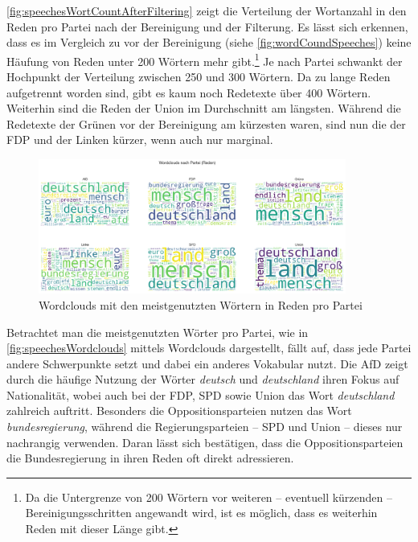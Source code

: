 \autoref{fig:speechesWortCountAfterFiltering} zeigt die Verteilung der Wortanzahl in den Reden pro Partei nach der Bereinigung und der Filterung. Es lässt sich erkennen, dass es im Vergleich zu vor der Bereinigung (siehe \autoref{fig:wordCoundSpeeches}) keine Häufung von Reden unter \num{200} Wörtern mehr gibt.\footnote{Da die Untergrenze von \num{200} Wörtern vor weiteren -- eventuell kürzenden -- Bereinigungsschritten angewandt wird, ist es möglich, dass es weiterhin Reden mit dieser Länge gibt.} Je nach Partei schwankt der Hochpunkt der Verteilung zwischen \num{250} und \num{300} Wörtern. Da zu lange Reden aufgetrennt worden sind, gibt es kaum noch Redetexte über \num{400} Wörtern. Weiterhin sind die Reden der Union im Durchschnitt am längsten. Während die Redetexte der Grünen vor der Bereinigung am kürzesten waren, sind nun die der \ac{FDP} und der Linken kürzer, wenn auch nur marginal.

\begin{figure}[H]
    \centering
    \includegraphics[width=0.9\textwidth]{data/images/speeches_wordclouds.png}
    \caption{Wordclouds mit den meistgenutzten Wörtern in Reden pro Partei} \label{fig:speechesWordclouds}
\end{figure}

Betrachtet man die meistgenutzten Wörter pro Partei, wie in \autoref{fig:speechesWordclouds} mittels Wordclouds dargestellt, fällt auf, dass jede Partei andere Schwerpunkte setzt und dabei ein anderes Vokabular nutzt. Die \ac{AfD} zeigt durch die häufige Nutzung der Wörter \textit{deutsch} und \textit{deutschland} ihren Fokus auf Nationalität, wobei auch bei der \ac{FDP}, \ac{SPD} sowie Union das Wort \textit{deutschland} zahlreich auftritt. Besonders die Oppositionsparteien nutzen das Wort \textit{bundesregierung}, während die Regierungsparteien -- \ac{SPD} und Union -- dieses nur nachrangig verwenden. Daran lässt sich bestätigen, dass die Oppositionsparteien die Bundesregierung in ihren Reden oft direkt adressieren.

